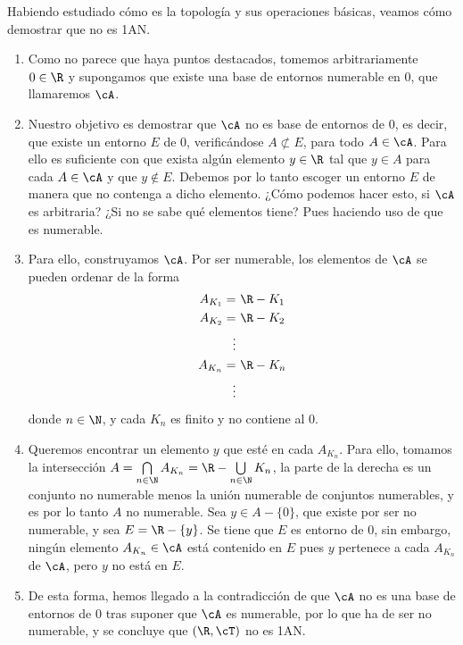 \begin{ej}
\begin{enumerate}[label=--, topsep=0pt, itemsep=0pt]
    \end{enumerate}

    \smallskip

    Habiendo estudiado cómo es la topología y sus operaciones básicas, veamos cómo demostrar que no es 1AN.

    \begin{enumerate}[itemsep=0pt, topsep=0pt, label=--]
        \item Como no parece que haya puntos destacados, tomemos arbitrariamente $0\in\R$ y supongamos que existe una base de entornos numerable en $0$, que llamaremos $\cA$.
        \item Nuestro objetivo es demostrar que $\cA$ no es base de entornos de $0$, es decir, que existe un entorno $E$ de $0$, verificándose $A\not\subset E$, para todo $A\in\cA$. Para ello es suficiente con que exista algún elemento $y\in\R$ tal que $y\in A$ para cada $A\in\cA$ y que $y\notin E$. Debemos por lo tanto escoger un entorno $E$ de manera que no contenga a dicho elemento. ¿Cómo podemos hacer esto, si $\cA$ es arbitraria? ¿Si no se sabe qué elementos tiene? Pues haciendo uso de que es numerable.\warning%
        \item Para ello, construyamos $\cA$. Por ser numerable, los elementos de $\cA$ se pueden ordenar de la forma
        \vspace{-1em}
        \begin{align*}
            A_{K_1} = & \ \R - K_1\\
            A_{K_2} = & \ \R - K_2\\
            \vdots&\\
            A_{K_n} = & \ \R - K_n\\
            \vdots&
        \end{align*}
        donde $n\in\N$, y cada $K_n$ es finito y no contiene al $0$.
        \item Queremos encontrar un elemento $y$ que esté en cada $A_{K_n}$. Para ello, tomamos la intersección $A = \bigcap\limits_{n\in\N} A_{K_n} = \R - \bigcup\limits_{n\in\N}K_n$, la parte de la derecha es un conjunto no numerable menos la unión numerable de conjuntos numerables, y es por lo tanto $A$ no numerable. Sea $y\in A - \{0\}$, que existe por ser no numerable, y sea $E = \R - \{y\}$. Se tiene que $E$ es entorno de $0$, sin embargo, ningún elemento $A_{K_n}\in\cA$ está contenido en $E$ pues $y$ pertenece a cada $A_{K_n}$ de $\cA$, pero $y$ no está en $E$.
        \item De esta forma, hemos llegado a la contradicción de que $\cA$ no es una base de entornos de $0$ tras suponer que $\cA$ es numerable, por lo que ha de ser no numerable, y se concluye que $(\R, \cT)$ no es 1AN.
    \end{enumerate}
\end{ej}

